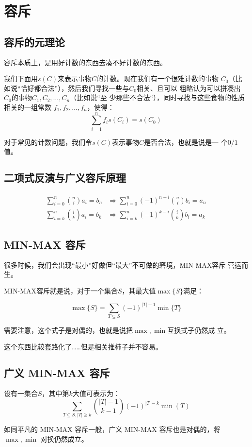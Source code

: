 \section{容斥}
\subsection{容斥的元理论}
容斥本质上，是用好计数的东西去凑不好计数的东西。\par
我们下面用$s(C)$来表示事物$C$的计数。现在我们有一个很难计数的事物
$C_0$（比如说“恰好都合法”），然后我们寻找一些与$C_0$相关、且可以
粗略认为可以拼凑出$C_0$的事物$C_1, C_2, \ldots, C_n$（比如说“至
少那些不合法“），同时寻找与这些食物的性质相关的一组常数
$f_1, f_2, \ldots, f_n$，使得：
\[\sum_{i = 1}^n f_i s(C_i) = s(C_0)\]\par
对于常见的计数问题，我们令$s(C)$表示事物$C$是否合法，也就是说是一
个$0/1$值。
\subsection{二项式反演与广义容斥原理}
\[
\begin{aligned}
\sum_{i = 0}^n\binom n i a_i = b_n&\Longrightarrow
\sum_{i = 0}^n(-1)^{n - i}\binom n i b_i = a_n\\
\sum_{i = k}^n\binom i k a_i = b_k&\Longrightarrow
\sum_{i = k}^n(-1)^{k - i}\binom i k b_i = a_k
\end{aligned}
\]
\subsection{MIN-MAX 容斥}
很多时候，我们会出现“最小”好做但“最大”不可做的窘境，MIN-MAX容斥
营运而生。\par
MIN-MAX容斥就是说，对于一个集合$S$，其最大值$\max\{S\}$满足：\par
\[\max\{S\} = \sum_{T\subseteq S} (-1)^{|T| + 1}\min\{T\}\]\par
需要注意，这个式子是对偶的，也就是说把$\max,\min$互换式子仍然成
立。\par
这个东西比较套路化了……但是相关推柿子并不容易。

\subsection{广义 MIN-MAX 容斥}
设有一集合$S$，其中第$k$大值可表示为：
\[\sum_{T\subseteq S,|T|\ge k}\binom{|T|-1}{k-1}(-1)^{|T|-k}\min(T)\]\par
如同平凡的 MIN-MAX 容斥一般，广义 MIN-MAX 容斥也是对偶的，将$\max,\min$
对换仍然成立。

